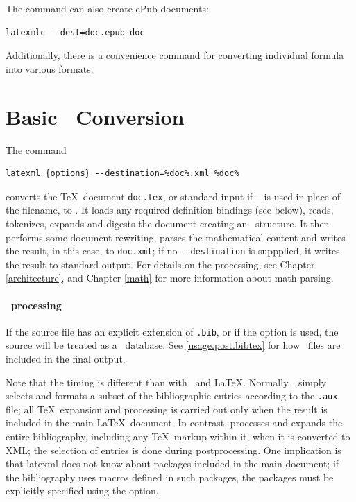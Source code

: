 \documentclass{book}
\newcommand{\shellcode}{\lstinline[style=shell]}
\begin{document}
The command  can also create ePub documents:
\begin{lstlisting}[style=shell]
latexmlc --dest=doc.epub doc
\end{lstlisting}

Additionally, there is a convenience command 
for converting individual formula into various formats.

\section[Conversion]{Basic \XML\ Conversion}\label{usage.conversion}
The command
\begin{lstlisting}[style=shell]
latexml {options} --destination=%doc%.xml %doc%
\end{lstlisting}
converts the \TeX\ document \texttt{doc.tex},
or standard input if \texttt{-} is used in place of the filename, to \XML.
It loads any required definition bindings (see below),
reads, tokenizes, expands and digests the document creating an \XML\ structure.
It then performs some document rewriting, parses the mathematical content
and writes the result, in this case, to \texttt{doc.xml};
if no \shellcode|--destination| is suppplied, it writes the result to standard output.
For details on the processing, see Chapter \ref{architecture},
and Chapter \ref{math} for more information about math parsing.

\paragraph{\BibTeX\ processing}\label{usage.conversion.bibtex}
If the source file has an explicit extension of \texttt{.bib},
or if the  option is used, the source will be
treated as a \BibTeX\ database.  See \ref{usage.post.bibtex}
for how \BibTeX\ files are included in the final output.

\begin{advanced}
Note that the timing is different than with \BibTeX\ and \LaTeX.
Normally, \BibTeX\ simply selects and formats a subset of the
bibliographic entries according to the \texttt{.aux} file;
all \TeX\ expansion and processing is carried out only when
the result is included in the main \LaTeX\ document.
In contrast,  processes and expands
the entire bibliography, including any \TeX\ markup within it,
when it is converted to XML;
the selection of entries is done during postprocessing.
One implication is that latexml does not know about packages
included in the main document; if the bibliography uses
macros defined in such packages, the packages must be explicitly
specified using the  option.
\end{advanced}
\end{document}
